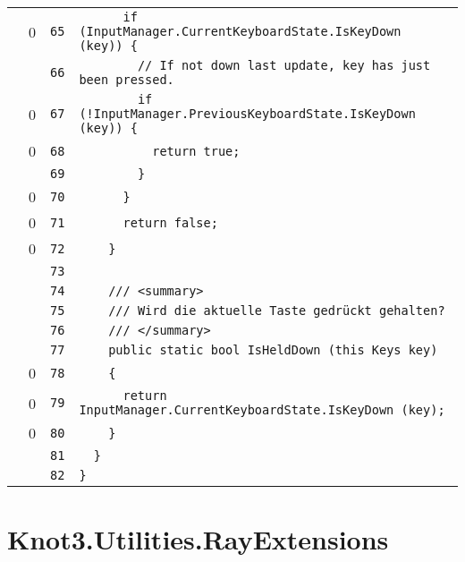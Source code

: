 \documentclass[a4paper,10pt]{article}
\begin{document}
\begin{longtable}[l]{lrrl}
\cellcolor{red} & 0 & \verb~65~ & \verb~      if (InputManager.CurrentKeyboardState.IsKeyDown (key)) {~\\
\cellcolor{gray} &  & \verb~66~ & \verb~        // If not down last update, key has just been pressed.~\\
\cellcolor{red} & 0 & \verb~67~ & \verb~        if (!InputManager.PreviousKeyboardState.IsKeyDown (key)) {~\\
\cellcolor{red} & 0 & \verb~68~ & \verb~          return true;~\\
\cellcolor{gray} &  & \verb~69~ & \verb~        }~\\
\cellcolor{red} & 0 & \verb~70~ & \verb~      }~\\
\cellcolor{red} & 0 & \verb~71~ & \verb~      return false;~\\
\cellcolor{red} & 0 & \verb~72~ & \verb~    }~\\
\cellcolor{gray} &  & \verb~73~ & \verb~~\\
\cellcolor{gray} &  & \verb~74~ & \verb~    /// <summary>~\\
\cellcolor{gray} &  & \verb~75~ & \verb~    /// Wird die aktuelle Taste gedrückt gehalten?~\\
\cellcolor{gray} &  & \verb~76~ & \verb~    /// </summary>~\\
\cellcolor{gray} &  & \verb~77~ & \verb~    public static bool IsHeldDown (this Keys key)~\\
\cellcolor{red} & 0 & \verb~78~ & \verb~    {~\\
\cellcolor{red} & 0 & \verb~79~ & \verb~      return InputManager.CurrentKeyboardState.IsKeyDown (key);~\\
\cellcolor{red} & 0 & \verb~80~ & \verb~    }~\\
\cellcolor{gray} &  & \verb~81~ & \verb~  }~\\
\cellcolor{gray} &  & \verb~82~ & \verb~}~\\
\end{longtable}
\newpage
\section{Knot3.Utilities.RayExtensions}
\end{document}
